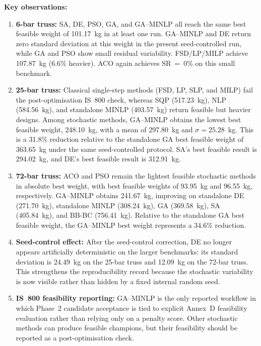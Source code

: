 \documentclass[lineno,pdflatex,sn-mathphys-num]{sn-jnl}
\begin{document}
\noindent
\textbf{Key observations:}
\begin{enumerate}
  \item \textbf{6-bar truss:} SA, DE, PSO, GA, and GA--MINLP all reach
        the same best feasible weight of 101.17~kg in at least one run.
        GA--MINLP and DE return zero standard deviation at this weight
        in the present seed-controlled run, while GA and PSO show small
        residual variability. FSD/LP/MILP achieve 107.87~kg (6.6\%
        heavier). ACO again achieves SR~=~0\% on this small benchmark.

  \item \textbf{25-bar truss:} Classical single-step methods
        (FSD, LP, SLP, and MILP) fail the post-optimisation IS~800 check,
        whereas SQP (517.23~kg), NLP (584.56~kg), and standalone MINLP
        (403.57~kg) return feasible but heavier designs.
        Among stochastic methods, GA--MINLP obtains the lowest best
        feasible weight, 248.10~kg, with a mean of 297.80~kg and
        $\sigma=25.28$~kg. This is a 31.8\% reduction relative to the
        standalone GA best feasible weight of 363.65~kg under the same
        seed-controlled protocol. SA's best feasible result is 294.02~kg,
        and DE's best feasible result is 312.91~kg.

  \item \textbf{72-bar truss:} ACO and PSO remain the lightest feasible
        stochastic methods in absolute best weight, with best feasible
        weights of 93.95~kg and 96.55~kg, respectively. GA--MINLP obtains
        241.67~kg, improving on standalone DE (271.70~kg), standalone
        MINLP (308.24~kg), GA (369.58~kg), SA (405.84~kg), and BB-BC
        (756.41~kg). Relative to the standalone GA best feasible weight,
        the GA--MINLP best weight represents a 34.6\% reduction.

  \item \textbf{Seed-control effect:} After the seed-control correction,
        DE no longer appears artificially deterministic on the larger
        benchmarks: its standard deviation is 24.49~kg on the 25-bar
        truss and 12.09~kg on the 72-bar truss. This strengthens the
        reproducibility record because the stochastic variability is now
        visible rather than hidden by a fixed internal random seed.

  \item \textbf{IS~800 feasibility reporting:} GA--MINLP is the only reported
        workflow in which Phase~2 candidate acceptance is tied to explicit
        Annex~D feasibility evaluation rather than relying only on a penalty
        score. Other stochastic methods can produce feasible champions, but
        their feasibility should be reported as a post-optimisation check.
\end{enumerate}
\end{document}

